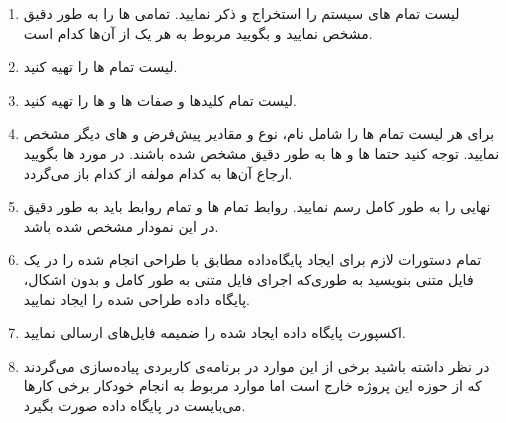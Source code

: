 \documentclass[12pt,a4paper]{article}
\begin{document}
\begin{enumerate}
\item لیست تمام های سیستم را استخراج و ذکر نمایید. تمامی ها را به طور دقیق مشخص نمایید و بگویید   مربوط به هر یک از آن‌ها کدام است.

\item لیست تمام ها را تهیه کنید.


\item لیست تمام کلید‌ها و صفات ها و ها را تهیه کنید.

\item برای هر  لیست تمام ها را شامل نام، نوع و مقادیر پیش‌فرض و های دیگر مشخص نمایید. توجه کنید حتما ها و ها به طور دقیق مشخص شده باشند. در مورد ها بگویید ارجاع آن‌ها به کدام مولفه از کدام  باز می‌گردد.

\item {} نهایی را به طور کامل رسم نمایید. روابط تمام ها و  تمام روابط باید به طور دقیق در این نمودار مشخص شده باشد.

\item تمام دستورات لازم برای ایجاد پایگاه‌داده مطابق با طراحی انجام شده را در یک فایل متنی بنویسید به طوری‌که اجرای فایل متنی به طور کامل و بدون اشکال، پایگاه داده طراحی شده را ایجاد نمایید.

\item اکسپورت پایگاه داده ایجاد شده را ضمیمه فایل‌های ارسالی نمایید.

\item در نظر داشته باشید برخی از این موارد در برنامه‌ی کاربردی پیاده‌سازی می‌گردند که از حوزه این پروژه خارج است اما موارد مربوط به انجام خودکار برخی کارها می‌بایست در پایگاه داده صورت بگیرد.
\end{enumerate}
\end{document}
